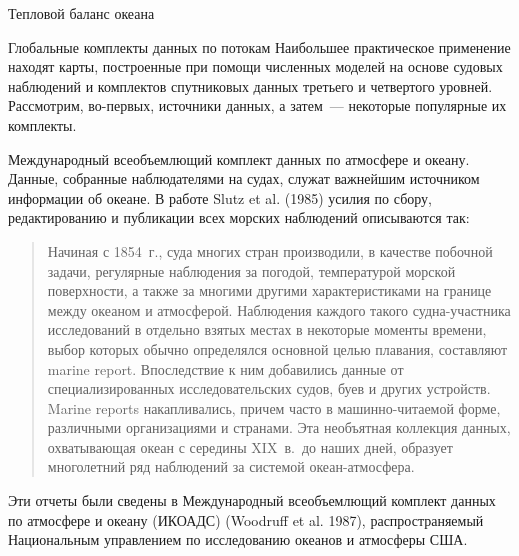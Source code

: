 \begin{chapter}{Тепловой баланс океана}
\begin{section}{Глобальные комплекты данных по потокам}
Наибольшее практическое применение находят карты, построенные при помощи
численных моделей на основе судовых наблюдений и комплектов спутниковых 
данных третьего и четвертого уровней. Рассмотрим, во-первых, источники данных,
а затем~--- некоторые популярные их комплекты.
%

\begin{paragraph}{Международный всеобъемлющий комплект данных по атмосфере 
и океану.}
Данные, собранные наблюдателями на судах, служат важнейшим источником 
информации об океане. В работе Slutz et al. (1985) усилия по сбору, 
редактированию и публикации всех морских наблюдений описываются так:
\begin{quotation}
Начиная с 1854~г., суда многих стран производили, в качестве побочной 
задачи, регулярные наблюдения за погодой, температурой морской 
поверхности, а также за многими другими характеристиками на границе между 
океаном и атмосферой. Наблюдения каждого такого судна-участника исследований 
в отдельно взятых местах в некоторые моменты времени, выбор которых обычно 
определялся основной целью плавания, составляют marine report. 
Впоследствие к ним добавились данные от специализированных 
исследовательских судов, буев и других устройств. Marine reports накапливались,
причем часто в машинно-читаемой форме, различными организациями и странами.
Эта необъятная коллекция данных, охватывающая океан с середины XIX~в.\ до
наших дней, образует многолетний ряд наблюдений за системой океан-атмосфера.
\end{quotation}
Эти отчеты были сведены в Международный всеобъемлющий комплект данных по 
атмосфере и океану (ИКОАДС) (Woodruff et al.  1987), распространяемый
Национальным управлением по исследованию океанов и атмосферы США.
%

\end{paragraph}
\end{section}
\end{chapter}

